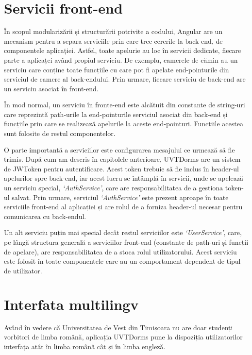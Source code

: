 \documentclass[12pt,a4paper]{report}
\theoremstyle{definition}
\theoremstyle{remark}
\begin{document}
\section{Servicii front-end}

\par În scopul modularizării și structurării potrivite a codului, Angular are un mecanism pentru a separa serviciile prin care trec cererile la back-end, de componentele aplicației. Astfel, toate apelurie au loc în servicii dedicate, fiecare parte a aplicaței având propiul serviciu. De exemplu, camerele de cămin au un serviciu care conține toate funcțiile cu care pot fi apelate end-pointurile din serviciul de camere al back-endului. Prin urmare, fiecare serviciu de back-end are un serviciu asociat în front-end.

\par În mod normal, un serviciu în fronte-end este alcătuit din constante de string-uri care reprezintă path-urile la end-pointurile serviciul asociat din back-end și funcțiile prin care se realizează apelurile la aceste end-pointuri. Funcțiile acestea sunt folosite de restul componentelor.

\par O parte importantă a serviciilor este configurarea mesajului ce urmează să fie trimis. După cum am descris în capitolele anterioare, UVTDorms are un sistem de JWToken pentru autentificare. Acest token trebuie să fie inclus în header-ul apelurilor spre back-end, iar acest lucru se întâmplă în servicii, unde se apelează un serviciu special, \textit{`AuthService'}, care are responsabilitatea de a gestiona token-ul salvat. Prin urmare, serviciul \textit{`AuthService'} este prezent aproape în toate serviciile front-end al aplicației și are rolul de a forniza header-ul necesar pentru comunicarea cu back-endul.

\par Un alt serviciu puțin mai special decât restul serviciilor este \textit{`UserService'}, care, pe lângă structura generală a serviciilor front-end (constante de path-uri și funcții de apelare), are responsabilitatea de a stoca rolul utilizatorului. Acest serviciu este folosit în toate componentele care au un comportament dependent de tipul de utilizator.

\section{Interfata multilingv}

\par Având în vedere că Universitatea de Vest din Timișoara nu are doar studenți vorbitori de limba română, aplicația UVTDorms pune la dispoziția utilizatorilor interfața atât în limba română cât și în limba engleză.
\end{document}
